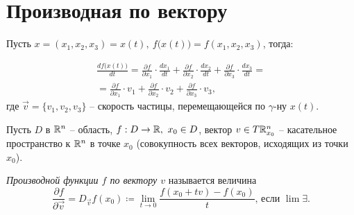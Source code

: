 

\section{Производная по вектору}

\begin{note}
    Пусть $ x = (x_1,x_2,x_3) = x(t), \ f\big(x(t)\big) = f(x_1,x_2,x_3)$, тогда:

    \begin{multline*}
        \frac{df\big(x(t)\big)}{dt} = \frac{\partial f}{\partial x_1} \cdot \frac{dx_1}{dt} + \frac{\partial f}{\partial x_2} \cdot \frac{dx_2}{dt} + \frac{\partial f}{\partial x_3} \cdot \frac{dx_3}{dt} = \\
        = \frac{\partial f}{\partial x_1} \cdot v_1 + \frac{\partial f}{\partial x_2} \cdot v_2 + \frac{\partial f}{\partial x_3} \cdot v_3,
    \end{multline*}
    где $\vec{v} = \{v_1,v_2,v_3\}$ -- скорость частицы, перемещающейся по $\gamma$-ну $x(t)$.
\end{note}

\begin{definition}
    Пусть $ D $ в $ \mathbb{R}^n $ -- область, $ f:D\rightarrow \mathbb{R}, \ x_0 \in D $, вектор $ v\in T\mathbb{R}_{x_0}^n $ -- касательное пространство к $ \mathbb{R}^n $ в точке $ x_0 $ (совокупность всех векторов, исходящих из точки $ x_0 $).

    \emph{Производной функции $ f $ по вектору $ v $} называется величина
    \[
        \frac{\partial f}{\partial \vec{v}} = D_{\vec{v}} f(x_0) \coloneqq \underset{t \rightarrow 0}{\lim}\frac{f(x_0 + tv) - f(x_0)}{t}\text{, если }\lim \exists.
    \]
\end{definition}

\newpage

